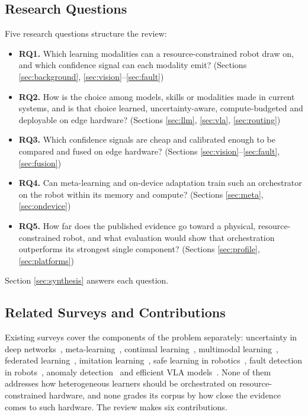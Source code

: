 \documentclass[journal]{IEEEtran}
\begin{document}
\subsection{Research Questions}\label{sec:rqs}
Five research questions structure the review:
\begin{itemize}
\item \textbf{RQ1.} Which learning modalities can a resource-constrained robot draw on, and which confidence signal can each modality emit? (Sections \ref{sec:background}, \ref{sec:vision}--\ref{sec:fault})
\item \textbf{RQ2.} How is the choice among models, skills or modalities made in current systems, and is that choice learned, uncertainty-aware, compute-budgeted and deployable on edge hardware? (Sections \ref{sec:llm}, \ref{sec:vla}, \ref{sec:routing})
\item \textbf{RQ3.} Which confidence signals are cheap and calibrated enough to be compared and fused on edge hardware? (Sections \ref{sec:vision}--\ref{sec:fault}, \ref{sec:fusion})
\item \textbf{RQ4.} Can meta-learning and on-device adaptation train such an orchestrator on the robot within its memory and compute? (Sections \ref{sec:meta}, \ref{sec:ondevice})
\item \textbf{RQ5.} How far does the published evidence go toward a physical, resource-constrained robot, and what evaluation would show that orchestration outperforms its strongest single component? (Sections \ref{sec:profile}, \ref{sec:platforms})
\end{itemize}
Section \ref{sec:synthesis} answers each question.


\subsection{Related Surveys and Contributions}\label{sec:related}
Existing surveys cover the components of the problem separately: uncertainty in deep networks~\cite{Gawlikowski2023}, meta-learning~\cite{Hospedales2022}, continual learning~\cite{DeLange2022}, multimodal learning~\cite{Baltrusaitis2019}, federated learning~\cite{Kairouz2021,Qi2021}, imitation learning~\cite{Osa2018}, safe learning in robotics~\cite{Brunke2022,Garcia2015}, fault detection in robots~\cite{Khalastchi2018}, anomaly detection~\cite{Pang2021} and efficient VLA models~\cite{Yu2025}. None of them addresses how heterogeneous learners should be orchestrated on resource-constrained hardware, and none grades its corpus by how close the evidence comes to such hardware. The review makes six contributions.
\end{document}
